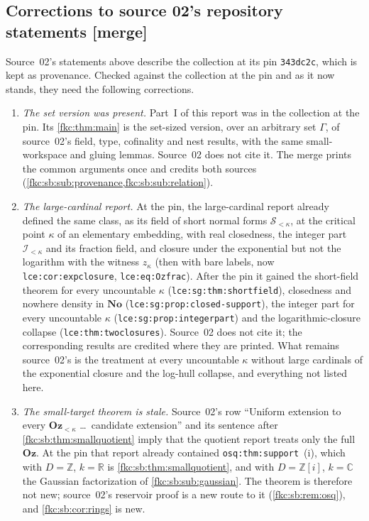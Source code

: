 \documentclass[11pt,letterpaper]{article}
\numberwithin{equation}{section}
\theoremstyle{definition}
\theoremstyle{remark}
\newcommand{\R}{\mathbb R}
\newcommand{\C}{\mathbb C}
\newcommand{\No}{\mathbf{No}}
\newcommand{\mergetag}{\textup{\textsf{\small[merge]}}}%
\newcommand{\Z}{\mathbb Z}
\newcommand{\Oz}{\mathbf{Oz}}
\newcommand{\Ok}{\Oz_{<\kappa}}
\newcommand{\lbl}[1]{\nolinkurl{#1}}%
\begin{document}
\subsection{Corrections to source 02's repository statements \mergetag}
\label{fkc:sb:sub:corrections}
Source~02's statements above describe the collection at its pin \texttt{343dc2c}, which is kept as provenance. Checked against the collection at the pin and as it now stands, they need the following corrections.
\begin{enumerate}[label=\textup{(\arabic*)}]
\item \emph{The set version was present.} Part~I of this report was in the collection at the pin. Its \cref{fkc:thm:main} is the set-sized version, over an arbitrary set $\Gamma$, of source~02's field, type, cofinality and nest results, with the same small-workspace and gluing lemmas. Source~02 does not cite it. The merge prints the common arguments once and credits both sources (\cref{fkc:sb:sub:provenance,fkc:sb:sub:relation}).
\item \emph{The large-cardinal report.} At the pin, the large-cardinal report already defined the same class, as its field of short normal forms $\mathscr S_{<\kappa}$, at the critical point $\kappa$ of an elementary embedding, with real closedness, the integer part $\mathscr I_{<\kappa}$ and its fraction field, and closure under the exponential but not the logarithm with the witness $z_\kappa$ (then with bare labels, now \lbl{lce:cor:expclosure}, \lbl{lce:eq:Ozfrac}). After the pin it gained the short-field theorem for every uncountable $\kappa$ (\lbl{lce:sg:thm:shortfield}), closedness and nowhere density in $\No$ (\lbl{lce:sg:prop:closed-support}), the integer part for every uncountable $\kappa$ (\lbl{lce:sg:prop:integerpart}) and the logarithmic-closure collapse (\lbl{lce:thm:twoclosures}). Source~02 does not cite it; the corresponding results are credited where they are printed. What remains source~02's is the treatment at every uncountable $\kappa$ without large cardinals of the exponential closure and the log-hull collapse, and everything not listed here.
\item \emph{The small-target theorem is stale.} Source~02's row ``Uniform extension to every $\Ok$ \ldots\ candidate extension'' and its sentence after \cref{fkc:sb:thm:smallquotient} imply that the quotient report treats only the full $\Oz$. At the pin that report already contained \lbl{osq:thm:support}~(i), which with $D=\Z$, $k=\R$ is \cref{fkc:sb:thm:smallquotient}, and with $D=\Z[i]$, $k=\C$ the Gaussian factorization of \cref{fkc:sb:sub:gaussian}. The theorem is therefore not new; source~02's reservoir proof is a new route to it (\cref{fkc:sb:rem:osq}), and \cref{fkc:sb:cor:rings} is new.

\end{enumerate}
\end{document}
